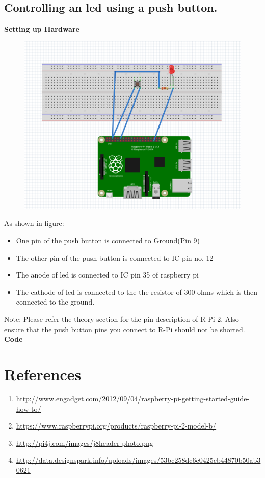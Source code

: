 \documentclass[11pt,a4paper]{article}
\begin{document}
	 \subsection{ Controlling an led using a push button.}
	 \textbf{Setting up Hardware}		
		\begin{figure}[h!]
			\includegraphics[scale=0.4]{GPIO.png}
			\centering
		\end{figure}
		As shown in figure:
		\begin{itemize}
			\item One pin of the push button is connected to Ground(Pin 9)
			\item The other pin of the push button is connected to IC pin no. 12
			\item The anode of led is connected to IC pin 35 of raspberry pi
			\item The cathode of led is connected to the the resistor of 300 ohms which is then connected to the ground.
		\end{itemize}
		
		Note: Please refer the theory section for the pin description of R-Pi 2. Also ensure that the push button pins you connect to R-Pi should not be shorted.
		\vspace{0.3cm}
		\newline
		\textbf{Code}
		
		
	\section{References}
	\begin{enumerate}
		\item \url{http://www.engadget.com/2012/09/04/raspberry-pi-getting-started-guide-how-to/}
		\item \url{https://www.raspberrypi.org/products/raspberry-pi-2-model-b/}
		\item \url{http://pi4j.com/images/j8header-photo.png}
		\item \url{http://data.designspark.info/uploads/images/53bc258dc6c0425cb44870b50ab30621}
	\end{enumerate}
	
	
\end{document}
